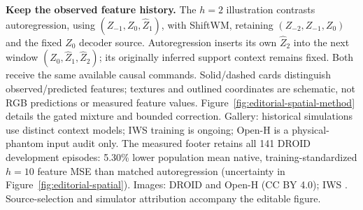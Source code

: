 \textbf{Keep the observed feature history.} The $h=2$ illustration contrasts autoregression, using $(Z_{-1},Z_0,\hat Z_1)$, with ShiftWM, retaining $(Z_{-2},Z_{-1},Z_0)$ and the fixed $Z_0$ decoder source. Autoregression inserts its own $\hat Z_2$ into the next window $(Z_0,\hat Z_1,\hat Z_2)$; its originally inferred support context remains fixed. Both receive the same available causal commands. Solid/dashed cards distinguish observed/predicted features; textures and outlined coordinates are schematic, not RGB predictions or measured feature values. Figure~\ref{fig:editorial-spatial-method} details the gated mixture and bounded correction. Gallery: historical simulations use distinct context models; IWS training is ongoing; Open-H is a physical-phantom input audit only. The measured footer retains all 141 DROID development episodes: 5.30\% lower population mean native, training-standardized $h=10$ feature MSE than matched autoregression (uncertainty in Figure~\ref{fig:editorial-spatial}). Images: DROID and Open-H (CC BY 4.0); IWS \citep{zhang2026rlawm}. Source-selection and simulator attribution accompany the editable figure.
